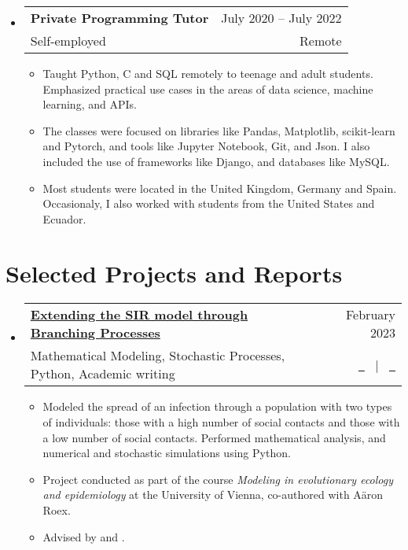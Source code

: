 \documentclass[a4paper,10pt]{article}
\makeatletter
\newcommand{\resumeQuadHeading}[4]{
  \item
  \begin{tabular*}{0.96\textwidth}[t]{l@{\extracolsep{\fill}}r}
    \textbf{#1} & \small #2 \\
    \small#3 & \small #4 \\
  \end{tabular*}
}
\newcommand{\resumeHeadingListStart}{
  \begin{itemize}[leftmargin=0.15in, label={}]
}
\newcommand{\resumeHeadingListEnd}{\end{itemize}}
\makeatother
\begin{document}
  
  \resumeHeadingListStart{}
    \resumeQuadHeading{Private Programming Tutor}{July 2020 – July 2022}
    {Self-employed}{Remote}
    \begin{itemize}[leftmargin=3em, itemsep=0.1em, topsep=2pt]
      \item \small Taught Python, C and SQL remotely to teenage and adult students. Emphasized practical use cases in the areas of data science, machine learning, and APIs.
      \item \small The classes were focused on libraries like Pandas, Matplotlib, scikit-learn and Pytorch, and tools like Jupyter Notebook, Git, and Json. I also included the use of frameworks like Django, and databases like MySQL. 
      \item \small Most students were located in the United Kingdom, Germany and Spain. Occasionaly, I also worked with students from the United States and Ecuador.
    \end{itemize}
  \resumeHeadingListEnd{}



\section{Selected Projects and Reports}
  \resumeHeadingListStart{}
  \resumeQuadHeading{\href{https://github.com/loredanasandu/sir-branching-processes}{Extending the SIR model through Branching Processes}}{February 2023}{\small Mathematical Modeling, Stochastic Processes, Python, Academic writing}{\href{https://github.com/loredanasandu/sir-branching-processes/blob/main/Report_Extending-the-SIR-model-through-BP.pdf}{\faFileTextO \ \graydotuline{Report}} \ $|$ \ \href{https://github.com/loredanasandu/sir-branching-processes/blob/main/Code_Extending-the-SIR-model-through-BP.ipynb}{\faGithub \ \graydotuline{Code}}}
  \begin{itemize}[leftmargin=3em, itemsep=0.1em, topsep=2pt]
    \item \small Modeled the spread of an infection through a population with two types of individuals: those with a high number of social contacts and those with a low number of social contacts. Performed mathematical analysis, and numerical and stochastic simulations using Python.
    \item \small Project conducted as part of the course \textit{Modeling in evolutionary ecology and epidemiology} at the University of Vienna, co-authored with Aäron Roex.
    \item \small Advised by \href{https://ufind.univie.ac.at/en/person.html?id=110430}{} and \href{https://mabshtml.univie.ac.at/polechova/}{}.
  \end{itemize}
  \resumeHeadingListEnd{}
\end{document}
